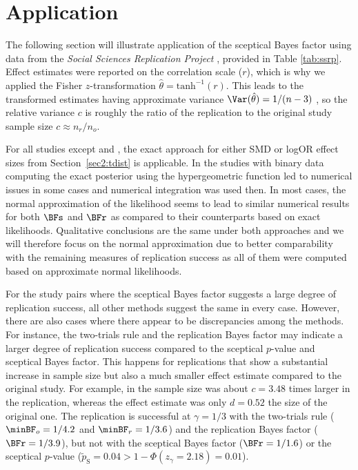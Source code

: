 \section{Application}
\label{sec2:applications}
The following section will illustrate application of the sceptical Bayes factor
using data from the \emph{Social Sciences Replication Project}
\citep{Camerer2018}, provided in Table \ref{tab:ssrp}. Effect estimates were
reported on the correlation scale ($r$), which is why we applied the Fisher
$z$-transformation $\hat{\theta} = \text{tanh}^{-1}(r)$. This leads to the
transformed estimates having approximate variance
\mbox{$\Var(\hat{\theta}) = 1/(n - 3)$} \citep{Fisher1921}, so the relative
variance $c$ is roughly the ratio of the replication to the original study
sample size $c \approx n_{r}/n_{o}$.

For all studies except \citet{Janssen2010} and \citet{Derex2013}, the exact
approach for either SMD or logOR effect sizes from Section~\ref{sec2:tdist} is
applicable. In the studies with binary data
computing the exact posterior using the hypergeometric function led to numerical
issues in some cases and numerical integration was used then.
In most cases, the normal approximation of the likelihood seems to lead to
similar numerical results for both $\BFs$ and $\BFr$ as compared to their
counterparts based on exact likelihoods. Qualitative conclusions are the same
under both approaches and we will therefore focus on the normal approximation
due to better comparability with the remaining measures of replication success
as all of them were computed based on approximate normal likelihoods.


For the study pairs where the sceptical Bayes factor suggests a large degree of
replication success, all other methods suggest the same in every case. However,
there are also cases where there appear to be discrepancies among the methods.
For instance, the two-trials rule and the replication Bayes factor may indicate
a larger degree of replication success compared to the sceptical $p$-value and
sceptical Bayes factor. This happens for replications that show a substantial
increase in sample size but also a much smaller effect estimate compared to the
original study. For example, in \citet{Balafoutas2012} the sample size was about
$c = 3.48$ times larger in the replication, whereas the effect estimate was only
$d = 0.52$ the size of the original one. The replication is successful at
$\gamma = 1/3$ with the two-trials rule ($\minBF_{o} = 1/4.2$ and
$\minBF_{r} = 1/3.6$) and the replication Bayes factor ($\BFr = 1/3.9$), but not
with the sceptical Bayes factor ($\BFr = 1/1.6$) or the sceptical $p$-value
($\tilde{p}_{\mathrm{S}} = 0.04 > 1 - \Phi(z_\gamma = 2.18) = 0.01$).

